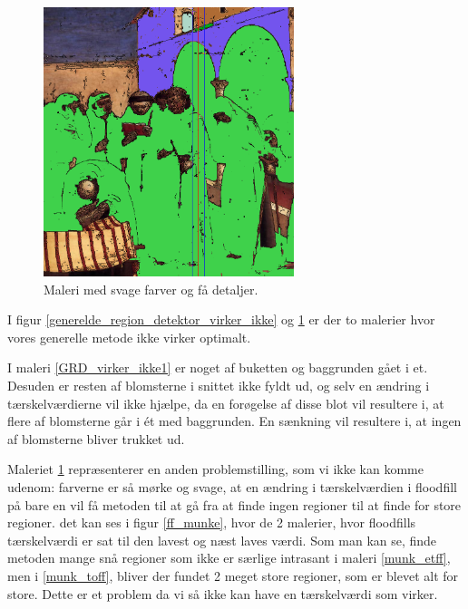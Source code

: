 \begin{figure}[!h]
	\begin{center}
	    \includegraphics[angle=0,width=0.65\textwidth]{afsnit/afprovning/billeder/thressholds/svage_farver/svage_detalier/floodfill/4-4.png}
	\end{center}    
	\caption{Maleri med svage farver og få detaljer.}
    \label{GRD_virker_ikke2}
\end{figure}

I figur \ref{generelde_region_detektor_virker_ikke} og
\ref{GRD_virker_ikke2} er der to malerier hvor
vores generelle metode ikke virker optimalt. 

I maleri \ref{GRD_virker_ikke1} er noget af buketten og baggrunden gået
i et. Desuden er resten af blomsterne i snittet ikke fyldt ud, og selv
en ændring i tærskelværdierne vil ikke hjælpe, da en forøgelse af disse
blot vil resultere i, at flere af blomsterne går i ét med baggrunden. En
sænkning vil resultere i, at ingen af blomsterne bliver trukket ud. 

Maleriet \ref{GRD_virker_ikke2} repræsenterer en anden problemstilling,
som vi ikke kan komme udenom: farverne er så mørke og svage, at en
ændring i tærskelværdien i floodfill på bare en vil få metoden til at gå
fra at finde ingen regioner til at finde for store regioner. det kan ses
i figur \ref{ff_munke}, hvor de 2 malerier, hvor floodfills tærskelværdi
er sat til den lavest og næst laves værdi. Som man kan se, finde metoden
mange snå regioner som ikke er særlige intrasant i maleri
\ref{munk_etff}, men i \ref{munk_toff}, bliver der fundet 2 meget store
regioner, som er blevet alt for store. Dette er et problem da vi så ikke
kan have en tærskelværdi som virker.

